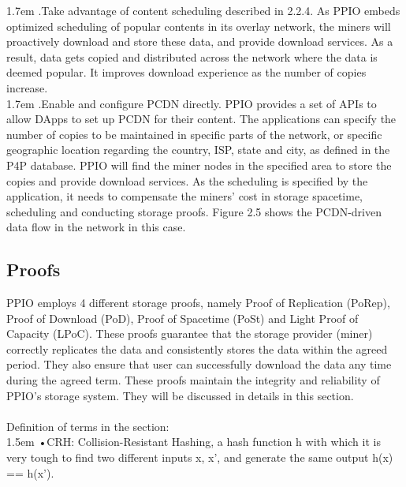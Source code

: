 \documentclass[10pt,a4paper]{article}
\begin{document}
\hangindent 1.7em
.\quad Take advantage of content scheduling described in 2.2.4.  As PPIO embeds optimized scheduling of popular contents in its overlay network,  the miners will proactively download and store these data, and provide download services. As a result, data gets copied and distributed across the network where the data is deemed popular. It improves download experience as the number of copies increase. 
\vspace{-0.7em}
\\

\hangindent 1.7em
.\quad Enable and configure PCDN directly. PPIO provides a set of APIs to allow DApps to set up PCDN for their content. The applications can specify the number of copies to be maintained in specific parts of the network, or specific geographic location regarding the country, ISP, state and city, as defined in the P4P database. PPIO will find the miner nodes in the specified area to store the copies and provide download services. As the scheduling is specified by the application, it needs to compensate the miners’ cost in storage spacetime, scheduling and conducting storage proofs. Figure 2.5 shows the PCDN-driven data flow in the network in this case.
\vspace{-1em}


         \subsection{Proofs}%
PPIO employs 4 different storage proofs, namely Proof of Replication (PoRep), Proof of Download (PoD), Proof of Spacetime (PoSt) and Light Proof of Capacity (LPoC). These proofs guarantee that the storage provider (miner) correctly replicates the data and consistently stores the data within the agreed period. They also ensure that user can successfully download the data any time during the agreed term. These proofs maintain the integrity and reliability of PPIO's storage system. They will be discussed in details in this section.
\vspace{-0.5em}
\\ \\Definition of terms in the section:
\vspace{-0.8em}
\\

\hangindent 1.5em
\noindent   
•\quad CRH: Collision-Resistant Hashing, a hash function h with which it is very tough to find two different inputs x, x', and generate the same output h(x) == h(x').
\vspace{-0.8em}
\\
\end{document}
